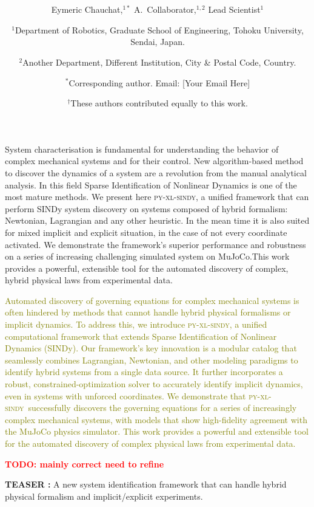 \documentclass[12pt]{article}
\date{}
\title{\bfseries \boldmath \scititle}
\author{
	Eymeric Chauchat,$^{1\ast}$
	A.~Collaborator,$^{1,2}$
	Lead Scientist$^{1}$\and
	\small$^{1}$Department of Robotics, Graduate School of Engineering, Tohoku University, Sendai, Japan.\and
	\small$^{2}$Another Department, Different Institution, City \& Postal Code, Country.\and
	\small$^\ast$Corresponding author. Email: [Your Email Here]\and
	\small$^\dagger$These authors contributed equally to this work.
	\TODO{correctly format, add correct people}
}
\renewenvironment{abstract}
	{\quotation}
	{\endquotation}
\newcommand{\frameworkname}{\textsc{py-xl-sindy}}
\newcommand{\TODO}[1]{\textbf{\textcolor{red}{\Large TODO: \normalsize #1}}}
\newcommand{\airevised}[1]{\textcolor{olive}{\small #1}}
\begin{document}
 

\maketitle

\begin{abstract} \bfseries \boldmath


System characterisation is fundamental for understanding the behavior of complex mechanical systems and for their control. New algorithm-based method to discover the dynamics of a system are a revolution from the manual analytical analysis. In this field Sparse Identification of Nonlinear Dynamics is one of the most mature methods. We present here \frameworkname, a unified framework that can perform SINDy system discovery on systems composed of hybrid formalism: Newtonian, Lagrangian and any other heuristic. In the mean time it is also suited for mixed implicit and explicit situation, in the case of not every coordinate activated. We demonstrate the framework's superior performance and robustness on a series of increasing challenging simulated system on MuJoCo.This work provides a powerful, extensible tool for the automated discovery of complex, hybrid physical laws from experimental data.

\airevised{Automated discovery of governing equations for complex mechanical systems is often hindered by methods that cannot handle hybrid physical formalisms or implicit dynamics. To address this, we introduce \frameworkname, a unified computational framework that extends Sparse Identification of Nonlinear Dynamics (SINDy). Our framework's key innovation is a modular catalog that seamlessly combines Lagrangian, Newtonian, and other modeling paradigms to identify hybrid systems from a single data source. It further incorporates a robust, constrained-optimization solver to accurately identify implicit dynamics, even in systems with unforced coordinates. We demonstrate that \frameworkname\ successfully discovers the governing equations for a series of increasingly complex mechanical systems, with models that show high-fidelity agreement with the MuJoCo physics simulator. This work provides a powerful and extensible tool for the automated discovery of complex physical laws from experimental data.}

\TODO{mainly correct need to refine}
\end{abstract}

\textbf{TEASER : } A new system identification framework that can handle hybrid physical formalism and implicit/explicit experiments.
\end{document}
